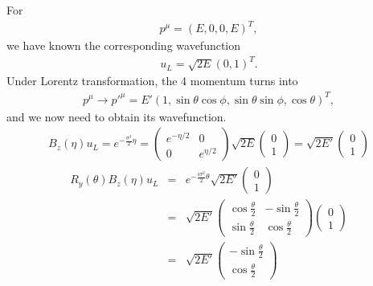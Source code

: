 \documentclass[11pt]{article}
\begin{document}
\section{ }
For
\begin{eqnarray}
    p^\mu = (E, 0, 0, E)^T,
\end{eqnarray}
we have known the corresponding wavefunction
\begin{eqnarray}
    u_L=\sqrt{2E} (0,1)^T.
\end{eqnarray}
Under Lorentz transformation, the 4 momentum turns into
\begin{eqnarray}
    p^\mu \to {p'}^\mu
    = E' (1, \sin\theta\cos\phi, \sin\theta\sin\phi, \cos\theta)^T, 
\end{eqnarray}
and we now need to obtain its wavefunction.
\begin{eqnarray}
    B_z(\eta)u_L=e^{-\frac{\sigma^3}{2} \eta}=
    \begin{pmatrix}
      e^{-\eta/2} & 0 \\
      0 & e^{\eta/2}
    \end{pmatrix}
    \sqrt{2E}
    \begin{pmatrix}
        0 \\ 1
    \end{pmatrix}
    =\sqrt{2E'}
    \begin{pmatrix}
        0 \\ 1
    \end{pmatrix}
\end{eqnarray}
\begin{eqnarray}
   R_y(\theta)B_z(\eta)u_L&=& e^{-\frac{i \sigma^2}{2} \theta}\sqrt{2E'}
   \begin{pmatrix}
    0 \\ 1
    \end{pmatrix}\\
    &=& \sqrt{2E'}
    \begin{pmatrix}
        \cos \frac{\theta}{2} & -\sin \frac{\theta}{2} \\
        \sin \frac{\theta}{2} & \cos \frac{\theta}{2}
    \end{pmatrix}
    \begin{pmatrix}
        0 \\ 1
    \end{pmatrix}\\
    &=&\sqrt{2E'}
    \begin{pmatrix}
        -\sin \frac{\theta}{2} \\ \cos \frac{\theta}{2}
    \end{pmatrix}
\end{eqnarray}
\end{document}
